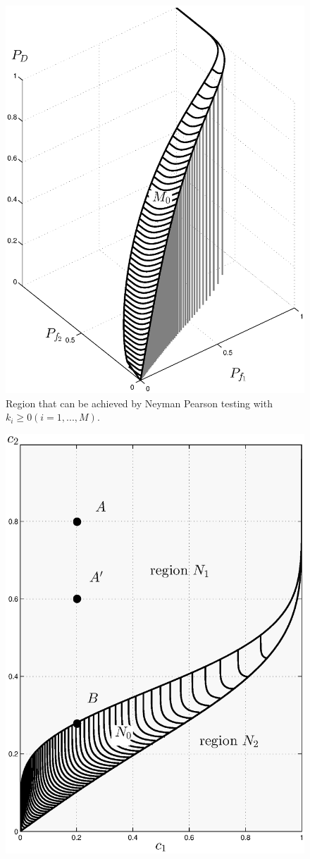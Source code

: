 \documentclass[12pt,journal,a4paper,twoside,doublecolumn]{IEEEtran}
\begin{document}
\begin{spacing}{1.0}
\begin{figure}[!t]
\centering
\includegraphics[width=12cm]{singleROC.eps}
\caption{Region that can be achieved by Neyman Pearson testing with $k_i \geq 0 (i=1, ..., M)$.}
\label{pic: surface for m0 gaussian}
\end{figure}
\newpage
\begin{figure}[!t]
\centering
\includegraphics[width=12cm]{singlecontour.eps}

\end{figure}
\end{spacing}
\end{document}
